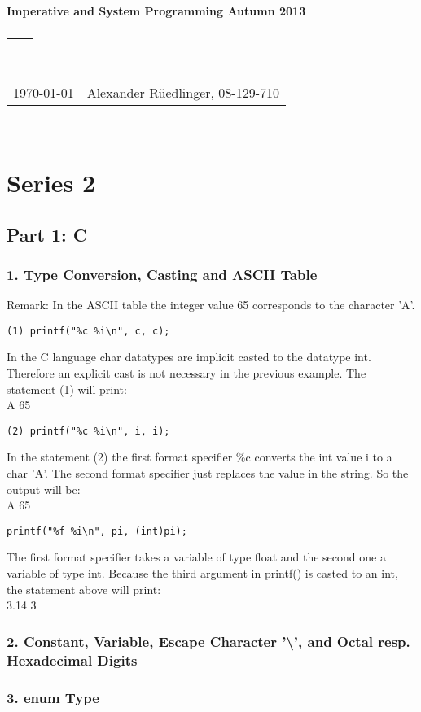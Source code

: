 \documentclass[12pt]{article}
\renewcommand{\title}[1]{\textbf{#1}\\}
\renewcommand{\line}{\begin{tabularx}{\textwidth}{X>{\raggedleft}X}\hline\\\end{tabularx}\\[-0.5cm]}
\newcommand{\leftright}[2]{\begin{tabularx}{\textwidth}{X>{\raggedleft}X}#1%
& #2\\\end{tabularx}\\[-0.5cm]}
\begin{document}
\title{Imperative and System Programming Autumn 2013}
\line
\leftright{\today}{Alexander Rüedlinger, 08-129-710} %
\section*{Series 2}
\subsection*{Part 1: C}
\subsubsection*{1. Type Conversion, Casting and ASCII Table}
Remark: In the ASCII table the integer value 65 corresponds to the character 'A'.
\begin{lstlisting}
(1) printf("%c %i\n", c, c);
\end{lstlisting}

In the C language char datatypes are implicit casted to the datatype int. Therefore an explicit cast is not necessary in the previous example.
The statement (1) will print:\\
A 65

\begin{lstlisting}
(2) printf("%c %i\n", i, i);
\end{lstlisting}
In the statement (2) the first format specifier \%c converts the int value i to a char 'A'. The second format specifier just replaces the value in the string.
So the output will be:\\
A 65

\begin{lstlisting}
printf("%f %i\n", pi, (int)pi);
\end{lstlisting}
The first format specifier takes a variable of type float and the second one a variable of type int.
Because the third argument in printf() is casted to an int, the statement above will print:\\

3.14 3

\subsubsection*{2. Constant, Variable, Escape Character '\textbackslash', and Octal resp. Hexadecimal Digits}

\subsubsection*{3. enum Type}
\end{document}
